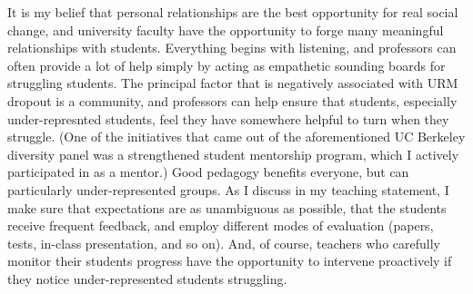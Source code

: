 \documentclass{article}
\begin{document}
It is my belief that personal relationships are the best opportunity for real
social change, and university faculty have the opportunity to forge many
meaningful relationships with students.  Everything begins with listening, and
professors can often provide a lot of help simply by acting as empathetic
sounding boards for struggling students.  The principal factor that is
negatively associated with URM dropout is a community, and professors can help
ensure that students, especially under-represnted students, feel they have
somewhere helpful to turn when they struggle.  (One of the initiatives that came
out of the aforementioned UC Berkeley diversity panel was a strengthened student
mentorship program, which I actively participated in as a mentor.)  Good
pedagogy benefits everyone, but can particularly under-represented groups. As I
discuss in my teaching statement, I make sure that expectations are as
unambiguous as possible, that the students receive frequent feedback, and employ
different modes of evaluation (papers, tests, in-class presentation, and so on).
And, of course, teachers who carefully monitor their students progress have the
opportunity to intervene proactively if they notice under-represented students
struggling.
\end{document}
